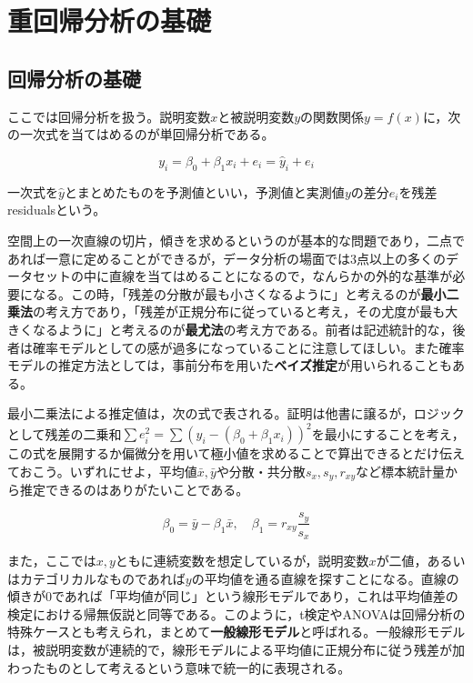 \documentclass[
  a4paper,
]{ltjsbook}
\begin{document}

\chapter{重回帰分析の基礎}\label{ux91cdux56deux5e30ux5206ux6790ux306eux57faux790e}

\section{回帰分析の基礎}\label{ux56deux5e30ux5206ux6790ux306eux57faux790e}

ここでは回帰分析を扱う。説明変数\(x\)と被説明変数\(y\)の関数関係\(y=f(x)\)に，次の一次式を当てはめるのが単回帰分析である。

\[ y_i  = \beta_0 + \beta_1 x_i + e_i = \hat{y}_i + e_i\]

一次式を\(\hat{y}\)とまとめたものを予測値といい，予測値と実測値\(y\)の差分\(e_i\)を残差residualsという。

空間上の一次直線の切片，傾きを求めるというのが基本的な問題であり，二点であれば一意に定めることができるが，データ分析の場面では3点以上の多くのデータセットの中に直線を当てはめることになるので，なんらかの外的な基準が必要になる。この時，「残差の分散が最も小さくなるように」と考えるのが\textbf{最小二乗法}の考え方であり，「残差が正規分布に従っていると考え，その尤度が最も大きくなるように」と考えるのが\textbf{最尤法}の考え方である。前者は記述統計的な，後者は確率モデルとしての感が過多になっていることに注意してほしい。また確率モデルの推定方法としては，事前分布を用いた\textbf{ベイズ推定}が用いられることもある。

最小二乗法による推定値は，次の式で表される。証明は他書\autocite{kosugi2018,Nishiuchi201712}に譲るが，ロジックとして残差の二乗和\(\sum e_i^2 = \sum (y_i - (\beta_0 + \beta_1 x_i))^2\)を最小にすることを考え，この式を展開するか偏微分を用いて極小値を求めることで算出できるとだけ伝えておこう。いずれにせよ，平均値\(\bar{x},\bar{y}\)や分散・共分散\(s_x,s_y,r_{xy}\)など標本統計量から推定できるのはありがたいことである。

\[\beta_0 = \bar{y} - \beta_1\bar{x},\quad \beta_1 = r_{xy} \frac{s_y}{s_x}\]

また，ここでは\(x,y\)ともに連続変数を想定しているが，説明変数\(x\)が二値，あるいはカテゴリカルなものであれば\(y\)の平均値を通る直線を探すことになる。直線の傾きが0であれば「平均値が同じ」という線形モデルであり，これは平均値差の検定における帰無仮説と同等である。このように，t検定やANOVAは回帰分析の特殊ケースとも考えられ，まとめて\textbf{一般線形モデル}と呼ばれる。一般線形モデルは，被説明変数が連続的で，線形モデルによる平均値に正規分布に従う残差が加わったものとして考えるという意味で統一的に表現される。
\end{document}
